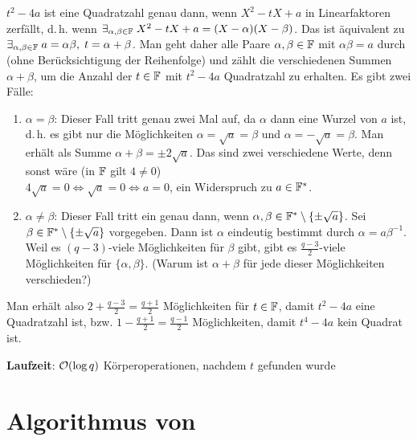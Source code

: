\begin{Beweis}
    $t^2 - 4a$ ist eine Quadratzahl genau dann, wenn $X^2 - tX + a$ in Linearfaktoren zerfällt,
    d.\,h. wenn $\exists_{\alpha, \beta \in \mathbb{F}}\; X^2 - tX + a = (X - \alpha)(X - \beta)$.
    Das ist äquivalent zu
    $\exists_{\alpha, \beta \in \mathbb{F}}\; a = \alpha\beta,\; t = \alpha + \beta$.
    Man geht daher alle Paare $\alpha, \beta \in \mathbb{F}$ mit $\alpha\beta = a$ durch
    (ohne Berücksichtigung der Reihenfolge)
    und zählt die verschiedenen Summen $\alpha + \beta$,
    um die Anzahl der $t \in \mathbb{F}$ mit $t^2 - 4a$ Quadratzahl zu erhalten.
    Es gibt zwei Fälle:
    \begin{enumerate}
        \item
        $\alpha = \beta$:
        Dieser Fall tritt genau zwei Mal auf, da $\alpha$ dann eine Wurzel von $a$ ist,
        d.\,h. es gibt nur die Möglichkeiten $\alpha = \sqrt{a} = \beta$ und
        $\alpha = -\sqrt{a} = \beta$.
        Man erhält als Summe $\alpha + \beta = \pm 2\sqrt{a}$.
        Das sind zwei verschiedene Werte, denn sonst wäre (in $\mathbb{F}$ gilt $4 \not= 0$)\\
        $4\sqrt{a} = 0 \iff \sqrt{a} = 0 \iff a = 0$, ein Widerspruch zu $a \in \mathbb{F}^\ast$.

        \item
        $\alpha \not= \beta$:
        Dieser Fall tritt ein genau dann, wenn
        $\alpha, \beta \in \mathbb{F}^\ast \setminus \{\pm\sqrt{a}\}$.
        Sei $\beta \in \mathbb{F}^\ast \setminus \{\pm\sqrt{a}\}$ vorgegeben.
        Dann ist $\alpha$ eindeutig bestimmt durch $\alpha = a\beta^{-1}$.
        Weil es $(q - 3)$-viele Möglichkeiten für $\beta$ gibt,
        gibt es $\frac{q-3}{2}$-viele Möglichkeiten für $\{\alpha, \beta\}$.
        (Warum ist $\alpha + \beta$ für jede dieser Möglichkeiten verschieden?)
    \end{enumerate}
    Man erhält also $2 + \frac{q-3}{2} = \frac{q+1}{2}$ Möglichkeiten für $t \in \mathbb{F}$,
    damit $t^2 - 4a$ eine Quadratzahl ist,
    bzw. $1 - \frac{q+1}{2} = \frac{q-1}{2}$ Möglichkeiten, damit $t^4 - 4a$ kein Quadrat ist.
\end{Beweis}

\linie

\textbf{Laufzeit}:
$\mathcal{O}(\log q)$ Körperoperationen, nachdem $t$ gefunden wurde

\pagebreak

\section{%
    Algorithmus von %
}

